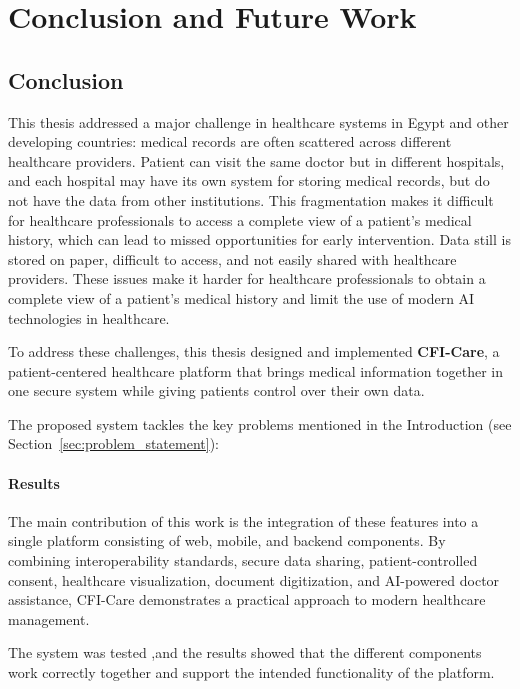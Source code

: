 \chapter{Conclusion and Future Work}\label{chap:conclAndFutureWork}

\section{Conclusion}

This thesis addressed a major challenge in healthcare systems in Egypt and other developing countries: medical records are often scattered across different healthcare providers. Patient can visit the same doctor but in different hospitals, and each hospital may have its own system for storing medical records, but do not have the data from other institutions. This fragmentation makes it difficult for healthcare professionals to access a complete view of a patient's medical history, which can lead to missed opportunities for early intervention.
Data still is stored on paper, difficult to access, and not easily shared with healthcare providers. These issues make it harder for healthcare professionals to obtain a complete view of a patient's medical history and limit the use of modern AI technologies in healthcare.

To address these challenges, this thesis designed and implemented \textbf{CFI-Care}, a patient-centered healthcare platform that brings medical information together in one secure system while giving patients control over their own data.

The proposed system tackles the key problems mentioned in the Introduction (see Section~\ref{sec:problem_statement}):

\subsubsection{Results}
The main contribution of this work is the integration of these features into a single platform consisting of web, mobile, and backend components. By combining interoperability standards,
 secure data sharing, patient-controlled consent, healthcare visualization, document digitization, and AI-powered doctor assistance,
  CFI-Care demonstrates a practical approach to modern healthcare management.

The system was tested ,and the results showed that the different components work correctly together and support the intended functionality of the platform.

